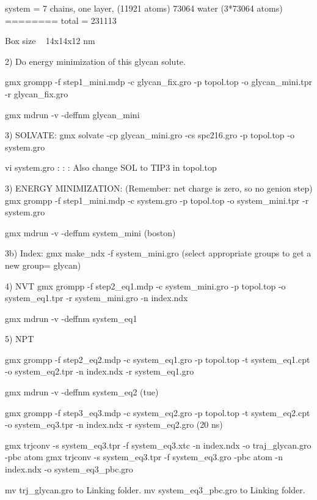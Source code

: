 system = 7 chains, one layer, (11921 atoms)
         73064 water (3*73064 atoms)
        ======== 
         total = 231113

       Box size ~ 14x14x12 nm


2) Do energy minimization of this glycan solute.

gmx grompp -f step1_mini.mdp -c glycan_fix.gro
 -p topol.top -o glycan_mini.tpr -r glycan_fix.gro

  gmx mdrun -v -deffnm glycan_mini


3) SOLVATE: 
gmx solvate -cp glycan_mini.gro -cs spc216.gro -p topol.top -o system.gro
   
  vi system.gro 
   :%
   :%
   :%
                    Also change SOL to TIP3  in topol.top  


3) ENERGY MINIMIZATION: (Remember: net charge is zero, so no genion step)
    gmx grompp -f step1_mini.mdp -c system.gro -p topol.top -o system_mini.tpr -r system.gro 

    gmx mdrun -v -deffnm system_mini  (boston)


3b) \Make Index:
   gmx make_ndx -f system_mini.gro 
     (select appropriate groups to get a new group= glycan)

4) \EQUILIBRATE NVT  
   gmx grompp -f step2_eq1.mdp -c system_mini.gro -p topol.top -o system_eq1.tpr -r system_mini.gro -n index.ndx 
   
   gmx mdrun -v -deffnm system_eq1   



5)  \EQUILIBRATE NPT

   gmx grompp -f step2_eq2.mdp -c system_eq1.gro -p topol.top -t system_eq1.cpt  -o system_eq2.tpr -n index.ndx -r system_eq1.gro

   gmx mdrun -v -deffnm system_eq2 (tue)



 gmx grompp -f step3_eq3.mdp -c system_eq2.gro -p topol.top -t system_eq2.cpt  -o system_eq3.tpr -n index.ndx -r system_eq2.gro (20 ns)
 

      gmx trjconv -s system_eq3.tpr -f system_eq3.xtc -n index.ndx -o traj_glycan.gro -pbc atom 
      gmx trjconv -s system_eq3.tpr -f system_eq3.gro -pbc atom -n index.ndx -o system_eq3_pbc.gro 
     
       mv trj_glycan.gro to Linking folder.
       mv system_eq3_pbc.gro to Linking folder.

